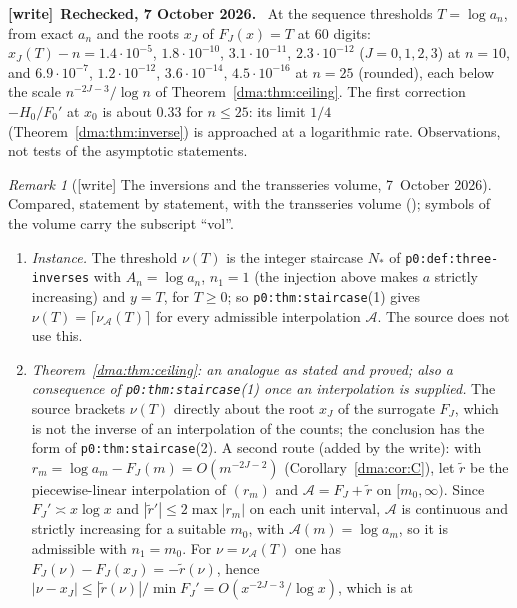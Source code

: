 \documentclass[11pt,letterpaper]{article}
\theoremstyle{remark}\newtheorem{remark}[theorem]{Remark}
\newcommand{\file}[1]{\nolinkurl{#1}}
\newenvironment{writenote}[1][]{\par\smallskip\begingroup\small
 \noindent\textbf{[write]}\if\relax\detokenize{#1}\relax\else~\textbf{#1.}\fi\ }%
 {\par\endgroup\smallskip}
\begin{document}
\begin{writenote}[Rechecked, 7 October 2026]
At the sequence thresholds $T=\log a_n$, from exact $a_n$ and the roots $x_J$
of $F_J(x)=T$ at 60 digits: $x_J(T)-n=1.4\cdot10^{-5}$, $1.8\cdot10^{-10}$,
$3.1\cdot10^{-11}$, $2.3\cdot10^{-12}$ ($J=0,1,2,3$) at $n=10$, and
$6.9\cdot10^{-7}$, $1.2\cdot10^{-12}$, $3.6\cdot10^{-14}$, $4.5\cdot10^{-16}$
at $n=25$ (rounded), each below the scale $n^{-2J-3}/\log n$ of
Theorem~\ref{dma:thm:ceiling}. The first correction $-H_0/F_0'$ at $x_0$ is
about $0.33$ for $n\le25$: its limit $1/4$ (Theorem~\ref{dma:thm:inverse}) is
approached at a logarithmic rate. Observations, not tests of the asymptotic
statements.
\end{writenote}
\begin{remark}[{[write]} The inversions and the transseries volume, 7~October 2026]\label{dma:rem:transseries}
Compared, statement by statement, with the transseries volume
();
symbols of the volume carry the subscript ``vol''.
\begin{enumerate}[label=(\alph*)]
\item \emph{Instance.} The threshold $\nu(T)$ is the integer staircase
 $N_\ast$ of \file{p0:def:three-inverses} with $A_n=\log a_n$, $n_1=1$ (the
 injection above makes $a$ strictly increasing) and $y=T$, for $T\ge0$; so
 \file{p0:thm:staircase}(1) gives $\nu(T)=\lceil\nu_{\mathcal A}(T)\rceil$ for
 every admissible interpolation $\mathcal A$. The source does not use this.
\item \emph{Theorem~\ref{dma:thm:ceiling}: an analogue as stated and proved;
 also a consequence of \file{p0:thm:staircase}(1) once an interpolation is
 supplied.} The source brackets $\nu(T)$ directly about the root $x_J$ of the
 surrogate $F_J$, which is not the inverse of an interpolation of the
 counts; the conclusion has the form of \file{p0:thm:staircase}(2). A second
 route (added by the write): with $r_m=\log a_m-F_J(m)=O(m^{-2J-2})$
 (Corollary~\ref{dma:cor:C}), let $\tilde r$ be the piecewise-linear
 interpolation of $(r_m)$ and $\mathcal A=F_J+\tilde r$ on $[m_0,\infty)$.
 Since $F_J'\asymp x\log x$ and $|\tilde r'|\le2\max|r_m|$ on each unit
 interval, $\mathcal A$ is continuous and strictly increasing for a suitable
 $m_0$, with $\mathcal A(m)=\log a_m$, so it is admissible with
 $n_1=m_0$. For $\nu=\nu_{\mathcal A}(T)$ one has
 $F_J(\nu)-F_J(x_J)=-\tilde r(\nu)$, hence
 $|\nu-x_J|\le|\tilde r(\nu)|/\min F_J'=O(x^{-2J-3}/\log x)$, which is at

\end{enumerate}
\end{remark}
\end{document}
